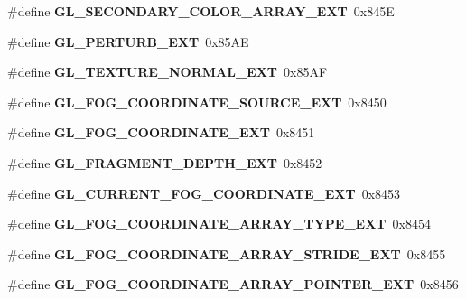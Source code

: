 \begin{DoxyCompactItemize}
\item 
\#define {\bfseries G\+L\+\_\+\+S\+E\+C\+O\+N\+D\+A\+R\+Y\+\_\+\+C\+O\+L\+O\+R\+\_\+\+A\+R\+R\+A\+Y\+\_\+\+E\+X\+T}~0x845\+E\label{_s_d_l__opengl_8h_ae8308c039d6cc3fc16ca16ef1f6b6a66}

\item 
\#define {\bfseries G\+L\+\_\+\+P\+E\+R\+T\+U\+R\+B\+\_\+\+E\+X\+T}~0x85\+A\+E\label{_s_d_l__opengl_8h_ab6e1381c3024409d936aceb303f64512}

\item 
\#define {\bfseries G\+L\+\_\+\+T\+E\+X\+T\+U\+R\+E\+\_\+\+N\+O\+R\+M\+A\+L\+\_\+\+E\+X\+T}~0x85\+A\+F\label{_s_d_l__opengl_8h_a09e349d32810af52238ac4743fd9242c}

\item 
\#define {\bfseries G\+L\+\_\+\+F\+O\+G\+\_\+\+C\+O\+O\+R\+D\+I\+N\+A\+T\+E\+\_\+\+S\+O\+U\+R\+C\+E\+\_\+\+E\+X\+T}~0x8450\label{_s_d_l__opengl_8h_a1de88d33778a83c513a154e2eb18ead3}

\item 
\#define {\bfseries G\+L\+\_\+\+F\+O\+G\+\_\+\+C\+O\+O\+R\+D\+I\+N\+A\+T\+E\+\_\+\+E\+X\+T}~0x8451\label{_s_d_l__opengl_8h_a80cc7ad341d1c8745e57c22477ef2b88}

\item 
\#define {\bfseries G\+L\+\_\+\+F\+R\+A\+G\+M\+E\+N\+T\+\_\+\+D\+E\+P\+T\+H\+\_\+\+E\+X\+T}~0x8452\label{_s_d_l__opengl_8h_a446b854752bbe34f89679d7e98ca5e84}

\item 
\#define {\bfseries G\+L\+\_\+\+C\+U\+R\+R\+E\+N\+T\+\_\+\+F\+O\+G\+\_\+\+C\+O\+O\+R\+D\+I\+N\+A\+T\+E\+\_\+\+E\+X\+T}~0x8453\label{_s_d_l__opengl_8h_aec4ad8b73b9126761d914bdae26936c3}

\item 
\#define {\bfseries G\+L\+\_\+\+F\+O\+G\+\_\+\+C\+O\+O\+R\+D\+I\+N\+A\+T\+E\+\_\+\+A\+R\+R\+A\+Y\+\_\+\+T\+Y\+P\+E\+\_\+\+E\+X\+T}~0x8454\label{_s_d_l__opengl_8h_af7be21f6f2b732aef5a27b54280124e3}

\item 
\#define {\bfseries G\+L\+\_\+\+F\+O\+G\+\_\+\+C\+O\+O\+R\+D\+I\+N\+A\+T\+E\+\_\+\+A\+R\+R\+A\+Y\+\_\+\+S\+T\+R\+I\+D\+E\+\_\+\+E\+X\+T}~0x8455\label{_s_d_l__opengl_8h_a251ffcba70e0ca7f6c4518cb11e14414}

\item 
\#define {\bfseries G\+L\+\_\+\+F\+O\+G\+\_\+\+C\+O\+O\+R\+D\+I\+N\+A\+T\+E\+\_\+\+A\+R\+R\+A\+Y\+\_\+\+P\+O\+I\+N\+T\+E\+R\+\_\+\+E\+X\+T}~0x8456\label{_s_d_l__opengl_8h_aa2f222ef5ca994fa97382523b44bb0cf}


\end{DoxyCompactItemize}

